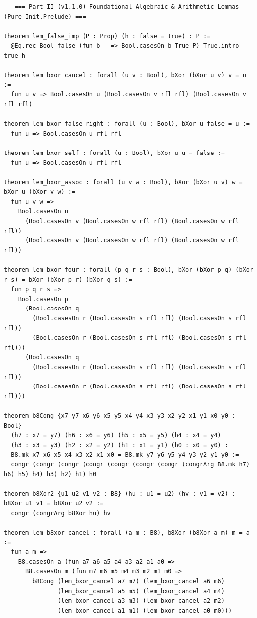 \documentclass[10pt,twocolumn]{article}
\theoremstyle{spectralthm}
\begin{document}
\begin{lstlisting}[language=Lean4,caption={Standalone Pure Init.Prelude Term-Mode Lean 4 Expansion (thm30--thm37, v1.1.0, 0 sorry, 0 axioms).},label={lst:lean_v110}]
-- === Part II (v1.1.0) Foundational Algebraic & Arithmetic Lemmas (Pure Init.Prelude) ===

theorem lem_false_imp (P : Prop) (h : false = true) : P :=
  @Eq.rec Bool false (fun b _ => Bool.casesOn b True P) True.intro true h

theorem lem_bxor_cancel : forall (u v : Bool), bXor (bXor u v) v = u :=
  fun u v => Bool.casesOn u (Bool.casesOn v rfl rfl) (Bool.casesOn v rfl rfl)

theorem lem_bxor_false_right : forall (u : Bool), bXor u false = u :=
  fun u => Bool.casesOn u rfl rfl

theorem lem_bxor_self : forall (u : Bool), bXor u u = false :=
  fun u => Bool.casesOn u rfl rfl

theorem lem_bxor_assoc : forall (u v w : Bool), bXor (bXor u v) w = bXor u (bXor v w) :=
  fun u v w =>
    Bool.casesOn u
      (Bool.casesOn v (Bool.casesOn w rfl rfl) (Bool.casesOn w rfl rfl))
      (Bool.casesOn v (Bool.casesOn w rfl rfl) (Bool.casesOn w rfl rfl))

theorem lem_bxor_four : forall (p q r s : Bool), bXor (bXor p q) (bXor r s) = bXor (bXor p r) (bXor q s) :=
  fun p q r s =>
    Bool.casesOn p
      (Bool.casesOn q
        (Bool.casesOn r (Bool.casesOn s rfl rfl) (Bool.casesOn s rfl rfl))
        (Bool.casesOn r (Bool.casesOn s rfl rfl) (Bool.casesOn s rfl rfl)))
      (Bool.casesOn q
        (Bool.casesOn r (Bool.casesOn s rfl rfl) (Bool.casesOn s rfl rfl))
        (Bool.casesOn r (Bool.casesOn s rfl rfl) (Bool.casesOn s rfl rfl)))

theorem b8Cong {x7 y7 x6 y6 x5 y5 x4 y4 x3 y3 x2 y2 x1 y1 x0 y0 : Bool}
  (h7 : x7 = y7) (h6 : x6 = y6) (h5 : x5 = y5) (h4 : x4 = y4)
  (h3 : x3 = y3) (h2 : x2 = y2) (h1 : x1 = y1) (h0 : x0 = y0) :
  B8.mk x7 x6 x5 x4 x3 x2 x1 x0 = B8.mk y7 y6 y5 y4 y3 y2 y1 y0 :=
  congr (congr (congr (congr (congr (congr (congr (congrArg B8.mk h7) h6) h5) h4) h3) h2) h1) h0

theorem b8Xor2 {u1 u2 v1 v2 : B8} (hu : u1 = u2) (hv : v1 = v2) : b8Xor u1 v1 = b8Xor u2 v2 :=
  congr (congrArg b8Xor hu) hv

theorem lem_b8xor_cancel : forall (a m : B8), b8Xor (b8Xor a m) m = a :=
  fun a m =>
    B8.casesOn a (fun a7 a6 a5 a4 a3 a2 a1 a0 =>
      B8.casesOn m (fun m7 m6 m5 m4 m3 m2 m1 m0 =>
        b8Cong (lem_bxor_cancel a7 m7) (lem_bxor_cancel a6 m6)
               (lem_bxor_cancel a5 m5) (lem_bxor_cancel a4 m4)
               (lem_bxor_cancel a3 m3) (lem_bxor_cancel a2 m2)
               (lem_bxor_cancel a1 m1) (lem_bxor_cancel a0 m0)))


\end{lstlisting}
\end{document}
